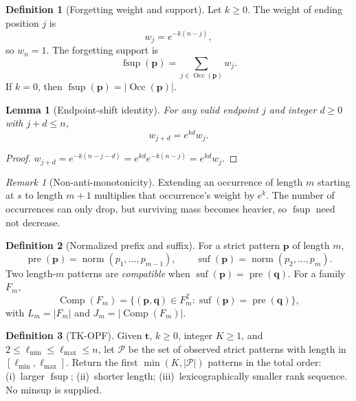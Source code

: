 \documentclass[preprint,12pt]{elsarticle}
\DeclareMathOperator{\fsup}{fsup}
\DeclareMathOperator{\norm}{norm}
\DeclareMathOperator{\Occ}{Occ}
\DeclareMathOperator{\pre}{pre}
\DeclareMathOperator{\suf}{suf}
\DeclareMathOperator{\Comp}{Comp}
\theoremstyle{plain}
\newtheorem{lemma}{Lemma}
\theoremstyle{definition}
\newtheorem{definition}{Definition}
\theoremstyle{remark}
\newtheorem{remark}{Remark}
\begin{document}
\begin{definition}[Forgetting weight and support]
\label{def:fsup}
Let $k\ge 0$. The weight of ending position $j$ is
\begin{equation}
\label{eq:wj}
w_j=e^{-k(n-j)},
\end{equation}
so $w_n=1$. The forgetting support is
\begin{equation}
\label{eq:fsup}
\fsup(\mathbf{p})=\sum_{j\in\Occ(\mathbf{p})} w_j.
\end{equation}
If $k=0$, then $\fsup(\mathbf{p})=|\Occ(\mathbf{p})|$.
\end{definition}

\begin{lemma}[Endpoint-shift identity]
\label{lem:shift}
For any valid endpoint $j$ and integer $d\ge 0$ with $j+d\le n$,
\begin{equation}
\label{eq:shift}
w_{j+d}=e^{kd}w_j.
\end{equation}
\end{lemma}
\begin{proof}
$w_{j+d}=e^{-k(n-j-d)}=e^{kd}e^{-k(n-j)}=e^{kd}w_j$.
\end{proof}

\begin{remark}[Non-anti-monotonicity]
\label{rem:nam}
Extending an occurrence of length $m$ starting at $s$ to length $m+1$ multiplies that occurrence's weight by $e^{k}$. The number of occurrences can only drop, but surviving mass becomes heavier, so $\fsup$ need not decrease.
\end{remark}

\begin{definition}[Normalized prefix and suffix]
\label{def:presuf}
For a strict pattern $\mathbf{p}$ of length $m$,
\begin{equation}
\label{eq:presuf}
\pre(\mathbf{p})=\norm(p_1,\ldots,p_{m-1}),\qquad
\suf(\mathbf{p})=\norm(p_2,\ldots,p_m).
\end{equation}
Two length-$m$ patterns are \emph{compatible} when $\suf(\mathbf{p})=\pre(\mathbf{q})$. For a family $F_m$,
\begin{equation}
\label{eq:comp}
\Comp(F_m)=\bigl\{(\mathbf{p},\mathbf{q})\in F_m^2:\suf(\mathbf{p})=\pre(\mathbf{q})\bigr\},
\end{equation}
with $L_m=|F_m|$ and $J_m=|\Comp(F_m)|$.
\end{definition}

\begin{definition}[TK-OPF]
\label{def:tkopf}
Given $\mathbf{t}$, $k\ge 0$, integer $K\ge 1$, and $2\le \ell_{\min}\le \ell_{\max}\le n$, let $\mathcal{P}$ be the set of observed strict patterns with length in $[\ell_{\min},\ell_{\max}]$. Return the first $\min(K,|\mathcal{P}|)$ patterns in the total order: (i)~larger $\fsup$; (ii)~shorter length; (iii)~lexicographically smaller rank sequence. No minsup is supplied.
\end{definition}
\end{document}
